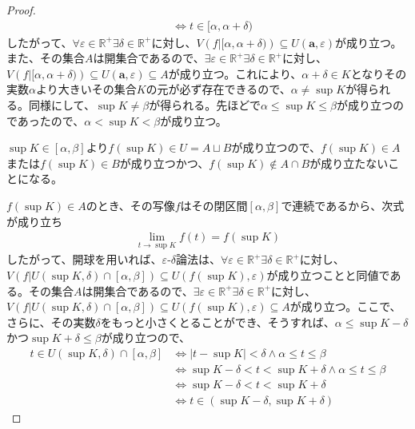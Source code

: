 \documentclass[dvipdfmx]{jsarticle}
\begin{document}
\begin{proof}
\begin{align*}
&\Leftrightarrow t \in [\alpha,\alpha + \delta)
\end{align*}
したがって、$\forall\varepsilon \in \mathbb{R}^{+}\exists\delta \in \mathbb{R}^{+}$に対し、$V\left( f|[\alpha,\alpha + \delta) \right) \subseteq U\left( \mathbf{a},\varepsilon \right)$が成り立つ。また、その集合$A$は開集合であるので、$\exists\varepsilon \in \mathbb{R}^{+}\exists\delta \in \mathbb{R}^{+}$に対し、$V\left( f|[\alpha,\alpha + \delta) \right) \subseteq U\left( \mathbf{a},\varepsilon \right) \subseteq A$が成り立つ。これにより、$\alpha + \delta \in K$となりその実数$\alpha$より大きいその集合$K$の元が必ず存在できるので、$\alpha \neq \sup K$が得られる。同様にして、$\sup K \neq \beta$が得られる。先ほどで$\alpha \leq \sup K \leq \beta$が成り立つのであったので、$\alpha < \sup K < \beta$が成り立つ。\par
$\sup K \in [\alpha,\beta]$より$f\left( \sup K \right) \in U = A \sqcup B$が成り立つので、$f\left( \sup K \right) \in A$または$f\left( \sup K \right) \in B$が成り立つかつ、$f\left( \sup K \right) \notin A \cap B$が成り立たないことになる。\par
$f\left( \sup K \right) \in A$のとき、その写像$f$はその閉区間$[\alpha,\beta]$で連続であるから、次式が成り立ち
\begin{align*}
\lim_{t \rightarrow \sup K}{f(t)} = f\left( \sup K \right)
\end{align*}
したがって、開球を用いれば、$\varepsilon$-$\delta$論法は、$\forall\varepsilon \in \mathbb{R}^{+}\exists\delta \in \mathbb{R}^{+}$に対し、$V\left( f|U\left( \sup K,\delta \right) \cap [\alpha,\beta] \right) \subseteq U\left( f\left( \sup K \right),\varepsilon \right)$が成り立つことと同値である。その集合$A$は開集合であるので、$\exists\varepsilon \in \mathbb{R}^{+}\exists\delta \in \mathbb{R}^{+}$に対し、$V\left( f|U\left( \sup K,\delta \right) \cap [\alpha,\beta] \right) \subseteq U\left( f\left( \sup K \right),\varepsilon \right) \subseteq A$が成り立つ。ここで、さらに、その実数$\delta$をもっと小さくとることができ、そうすれば、$\alpha \leq \sup K - \delta$かつ$\sup K + \delta \leq \beta$が成り立つので、
\begin{align*}
t \in U\left( \sup K,\delta \right) \cap [\alpha,\beta] &\Leftrightarrow \left| t - \sup K \right| < \delta \land \alpha \leq t \leq \beta\\
&\Leftrightarrow \sup K - \delta < t < \sup K + \delta \land \alpha \leq t \leq \beta\\
&\Leftrightarrow \sup K - \delta < t < \sup K + \delta\\
&\Leftrightarrow t \in \left( \sup K - \delta,\sup K + \delta \right)

\end{align*}
\end{proof}
\end{document}
